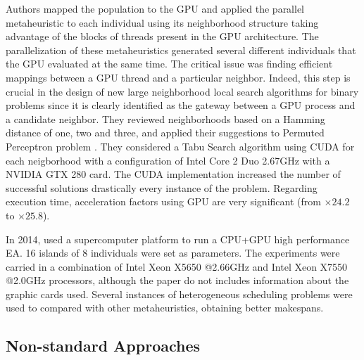 \documentclass[Afour,sageh,times]{sagej}
\begin{document}
Authors mapped the population to the GPU and applied the parallel metaheuristic to each individual using its neighborhood structure taking advantage of the blocks of threads present in the GPU architecture. The parallelization of these metaheuristics generated several different individuals that the GPU evaluated at the same time. The critical issue was finding efficient mappings between a GPU thread and a particular neighbor. Indeed, this step is crucial in the design of new large neighborhood local search algorithms for binary problems since it is clearly identified as the gateway between a GPU process and a candidate neighbor. They reviewed neighborhoods based on a Hamming distance of one, two and three, and applied their suggestions to Permuted Perceptron problem \citep{KnudsenPermutedPerceptronProblem1999}. They considered a Tabu Search algorithm \citep{TaillardTabySearch1991} using CUDA for each neigborhood with a configuration of Intel Core 2 Duo 2.67GHz with a NVIDIA GTX 280 card. The CUDA implementation increased the number of successful solutions drastically every instance of the problem. Regarding execution time, acceleration factors using GPU are very significant (from $\times24.2$ to $\times25.8$).

In 2014,  \cite{Wang14heterogeneous} used a supercomputer platform to run a CPU+GPU high performance EA. 16 islands of 8 individuals were set as parameters. The experiments were carried in a combination of Intel Xeon X5650 @2.66GHz and  Intel Xeon X7550 @2.0GHz processors, although the paper do not includes information about the graphic cards used. Several instances of heterogeneous scheduling problems were used to compared with other metaheuristics, obtaining better makespans. 


\subsection{Non-standard Approaches}
\end{document}
